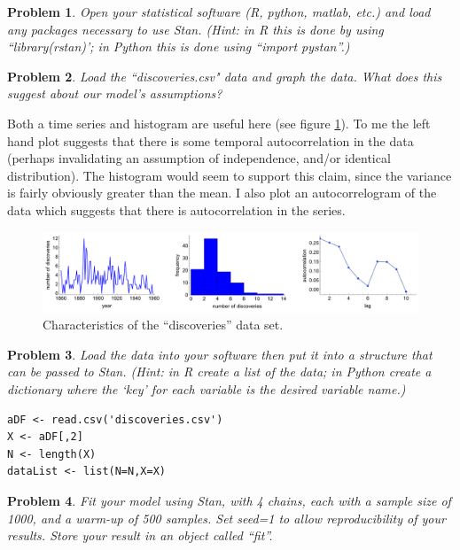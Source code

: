 \documentclass{article}
\newtheorem{problem}{Problem}[section]
\begin{document}
\begin{problem}
	Open your statistical software (R, python, matlab, etc.) and load any packages necessary to use Stan. (Hint: in R this is done by using ``library(rstan)'; in Python this is done using ``import pystan''.)
\end{problem}

\begin{problem}
Load the ``discoveries.csv" data and graph the data. What does this suggest about our model's assumptions?
\end{problem}

Both a time series and histogram are useful here (see figure \ref{fig:discoveriesTime}). To me the left hand plot suggests that there is some temporal autocorrelation in the data (perhaps invalidating an assumption of independence, and/or identical distribution). The histogram would seem to support this claim, since the variance is fairly obviously greater than the mean. I also plot an autocorrelogram of the data which suggests that there is autocorrelation in the series.

\begin{figure}[ht]
	\centerline{\includegraphics[width=1.5\textwidth]{figures/prob2_discoveriesTime.pdf}}
	\caption{Characteristics of the ``discoveries'' data set.}\label{fig:discoveriesTime}
\end{figure}

\begin{problem}
Load the data into your software then put it into a structure that can be passed to Stan. (Hint: in R create a list of the data; in Python create a dictionary where the `key' for each variable is the desired variable name.)

\begin{verbatim}
aDF <- read.csv('discoveries.csv')
X <- aDF[,2]
N <- length(X)
dataList <- list(N=N,X=X)
\end{verbatim}
\end{problem}

\begin{problem}
Fit your model using Stan, with 4 chains, each with a sample size of 1000, and a warm-up of 500 samples. Set seed=1 to allow reproducibility of your results. Store your result in an object called ``fit''.
\end{problem}
\end{document}
